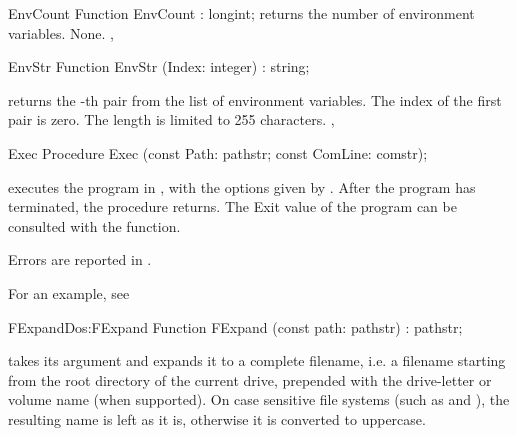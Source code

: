 

\begin{function}{EnvCount}
\Declaration
Function EnvCount  : longint;\Description
{} returns the number of environment variables.
\Errors
None.
\SeeAlso
{}, 
\end{function}

\begin{function}{EnvStr}
\Declaration
Function EnvStr (Index: integer) : string;\Description

 returns the -th  pair from the list
of environment variables. 
The index of the first pair is zero.
\Errors
The length is limited to 255 characters. 
\SeeAlso
{}, 
\end{function}


\begin{procedure}{Exec}
\Declaration
Procedure Exec (const Path: pathstr; const ComLine: comstr);
\Description

 executes the program in , with the options given by
.
After the program has terminated, the procedure returns. The Exit value of
the program can be consulted with the  function.

\Errors
Errors are reported in .
\SeeAlso
{}
\end{procedure}
For an example, see 
\begin{functionl}{FExpand}{Dos:FExpand}
\Declaration
Function FExpand (const path: pathstr) : pathstr;
\Description

 takes its argument and expands it to a complete filename, i.e.
a filename starting from the root directory of the current drive, prepended
with the drive-letter or volume name (when supported).
\Portability
On case sensitive file systems (such as \unix and \linux), the resulting
name is left as it is, otherwise it is converted to uppercase.
\Errors
{}
\SeeAlso

\end{functionl}

